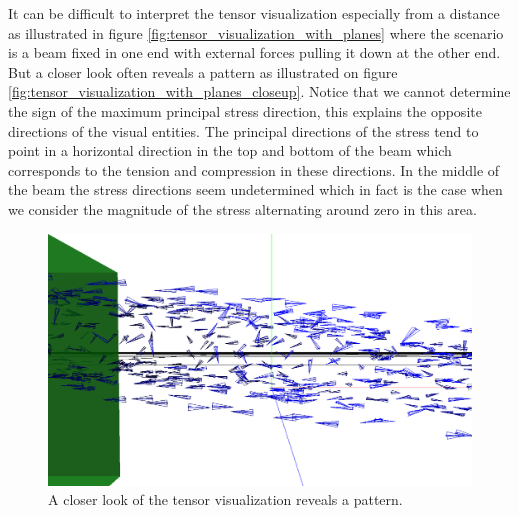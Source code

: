 It can be difficult to interpret the tensor visualization especially
from a distance as illustrated in figure
\vref{fig:tensor_visualization_with_planes} where the scenario is a
beam fixed in one end with external forces pulling it down at the
other end.
But a closer look often reveals a pattern as illustrated on figure
\vref{fig:tensor_visualization_with_planes_closeup}. Notice that we
cannot determine the sign of the maximum principal stress direction,
this explains the opposite directions of the visual entities.
The principal
directions of the stress tend to point in a horizontal direction in
the top and bottom of the beam which corresponds to the tension and
compression in these directions. In the middle of the beam the stress
directions seem undetermined which in fact is the case when we
consider the magnitude of the stress alternating around zero in this
area.


\begin{figure}
  \centering
  \includegraphics[width=12cm]{./images/helper_tools_tensor_visualization_1.png}
\caption{A closer look of the tensor visualization reveals a pattern.}
\label{fig:tensor_visualization_with_planes_closeup}
\end{figure}

